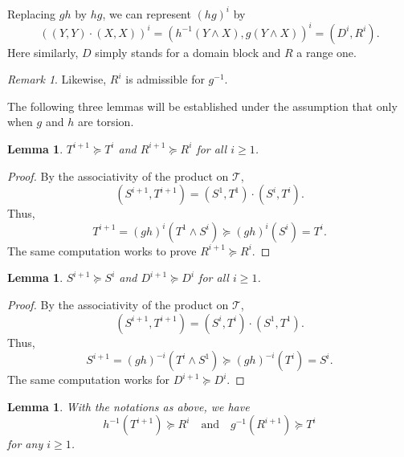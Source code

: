 \documentclass[12pt,reqno]{amsart}
\theoremstyle{plain}
\newtheorem{lemma}[theorem]{Lemma}
\theoremstyle{definition}
\theoremstyle{remark}
\newtheorem{remark}{Remark}[section]
\numberwithin{equation}{section}
\begin{document}
Replacing  $gh$  by  $hg$,   
we can represent  $(hg)^i$  by  
\begin{equation*} 
	((Y, Y) \cdot (X, X))^i = (h^{-1}(Y \wedge X), g(Y \wedge X))^i = (D^i, R^i).  
\end{equation*}  
Here similarly,
$D$  simply stands for a domain block and  $R$  a range one.  

\begin{remark}\label{Rm:Radmissible} 
	Likewise,  
	$R^i$  is admissible for  $g^{-1}$.  
\end{remark} 

The following three lemmas will be established under 
the assumption that only when  $g$  and  $h$  are torsion.   

\begin{lemma}\label{Lem:Filtration} 
	$T^{i+1} \succeq T^{i}$  and  $R^{i+1} \succeq R^{i}$   for all  $i \geq 1$.   
\end{lemma} 
\begin{proof}  
	By the associativity of the product on  $\mathcal{T}$, 
	\begin{equation*} 
		(S^{i+1}, T^{i+1}) = (S^1, T^1) \cdot (S^i, T^i).   
	\end{equation*} 
	Thus, 
	\begin{equation*} 
		T^{i+1} = (gh)^i(T^1 \wedge S^i) \succeq (gh)^i(S^i) = T^i.    
	\end{equation*} 
	The same computation works to prove  $R^{i+1} \succeq R^i$.  
\end{proof} 

\begin{lemma}\label{Lem:FiltrationII} 
	$S^{i+1} \succeq S^{i}$  and  $D^{i+1} \succeq D^{i}$   for all  $i \geq 1$.   
\end{lemma} 
\begin{proof}  
	By the associativity of the product on  $\mathcal{T}$, 
	\begin{equation*} 
		(S^{i+1}, T^{i+1}) = (S^i, T^i) \cdot (S^1, T^1).   
	\end{equation*} 
	Thus, 
	\begin{equation*} 
		S^{i+1} = (gh)^{-i}(T^i \wedge S^1) \succeq (gh)^{-i}(T^i) = S^i.   
	\end{equation*} 
	The same computation works for  $D^{i+1} \succeq D^i$.  
\end{proof} 

\begin{lemma}\label{Lem:TandR} 	
        With the notations as above, 
        we have 
	\begin{equation*}
		h^{-1}(T^{i+1}) \succeq R^i  
		\quad \text{and} \quad 
		g^{-1}(R^{i+1}) \succeq T^i  
	\end{equation*} 
	for any  $i \geq 1$.  
\end{lemma} 
\end{document}
